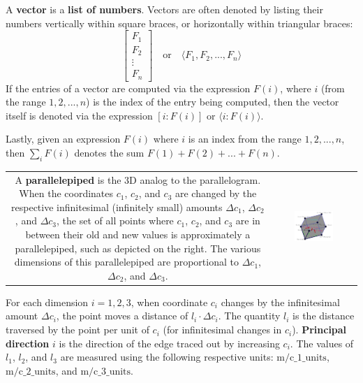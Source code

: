 A \textbf{vector} is a {\bf list of numbers}. Vectors are often denoted by listing their numbers vertically within square braces, or horizontally within triangular braces: 
\[\begin{bmatrix} F_1 \\ F_2 \\ \vdots \\ F_n \end{bmatrix} \quad\text{or}\quad \langle F_1, F_2, ..., F_n \rangle\]
If the entries of a vector are computed via the expression \(F(i)\), where \(i\) (from the range \(1, 2, ..., n\)) is the index of the entry being computed, then the vector itself is denoted via the expression \([i : F(i)]\) or \(\langle i : F(i) \rangle\).

Lastly, given an expression \(F(i)\) where \(i\) is an index from the range \(1, 2, ..., n\), then \(\sum_i F(i)\) denotes the sum \(F(1) + F(2) + ... + F(n)\).

\vspace{1mm}

\begin{tabular}{cc}
\parbox{0.5\textwidth}{
A {\bf parallelepiped} is the 3D analog to the parallelogram. When the coordinates \(c_1\), \(c_2\), and \(c_3\) are changed by the respective infinitesimal (infinitely small) amounts \(\Delta c_1\), \(\Delta c_2\), and \(\Delta c_3\), the set of all points where \(c_1\), \(c_2\), and \(c_3\) are in between their old and new values is approximately a parallelepiped, such as depicted on the right. The various dimensions of this parallelepiped are proportional to \(\Delta c_1\), \(\Delta c_2\), and \(\Delta c_3\). 
} & \parbox{0.5\textwidth}{
\includegraphics[width = 0.5\textwidth]{Coordinate_systems/coordinate_system_cell}
}
\end{tabular}

\vspace{1mm}

For each dimension \(i = 1, 2, 3\), when coordinate \(c_i\) changes by the infinitesimal amount \(\Delta c_i\), the point moves a distance of \(l_i \cdot \Delta c_i\). The quantity \(l_i\) is the distance traversed by the point per unit of \(c_i\) (for infinitesimal changes in \(c_i\)). {\bf Principal direction} \(i\) is the direction of the edge traced out by increasing \(c_i\). The values of \(l_1\), \(l_2\), and \(l_3\) are measured using the following respective units: \(\text{m}/\text{c\_1\_units}\), \(\text{m}/\text{c\_2\_units}\), and \(\text{m}/\text{c\_3\_units}\).   

